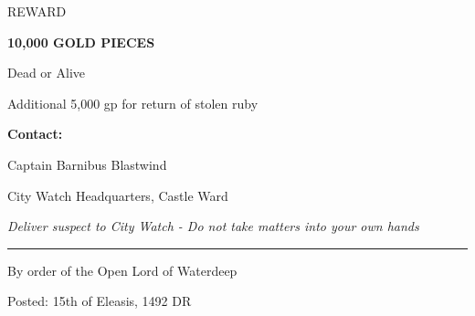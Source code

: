 \documentclass[letterpaper]{dndbook}
\begin{document}
\begin{center}

\begin{DndComment}{REWARD}
    \begin{center}
        {\Huge\textbf{10,000 GOLD PIECES}}

        \vspace{0.3cm}

        {\Large Dead or Alive}

        \vspace{0.3cm}

        {\large Additional 5,000 gp for return of stolen ruby}
    \end{center}
\end{DndComment}

\vspace{1cm}

{\large\textbf{Contact:}}

Captain Barnibus Blastwind

City Watch Headquarters, Castle Ward

\textit{Deliver suspect to City Watch - Do not take matters into your own hands}

\vspace{0.5cm}

\rule{\textwidth}{2pt}

\vspace{0.3cm}

{\small By order of the Open Lord of Waterdeep}

{\small Posted: 15th of Eleasis, 1492 DR}

\end{center}
\end{document}
